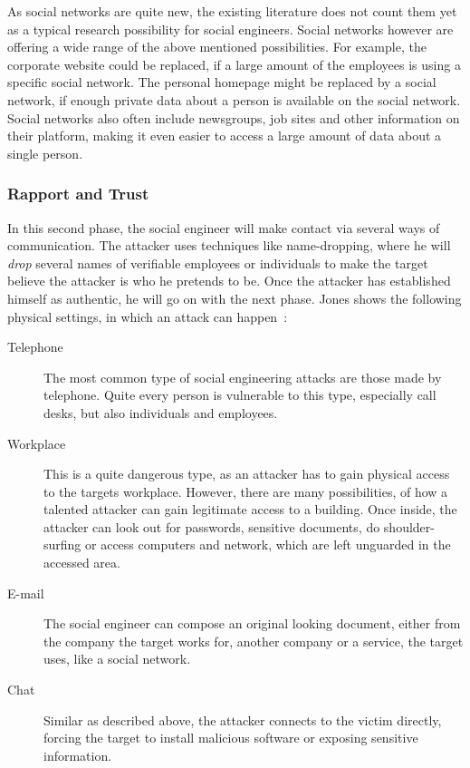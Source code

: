 As social networks are quite new, the existing literature does not count them
yet as a typical research possibility for social engineers. Social networks
however are offering a wide range of the above mentioned possibilities. For
example, the corporate website could be replaced, if a large amount of the
employees is using a specific social network. The personal homepage might be
replaced by a social network, if enough private data about a person is
available on the social network. Social networks also often include newsgroups,
job sites and other information on their platform, making it even easier to
access a large amount of data about a single person.


\subsubsection{Rapport and Trust}

In this second phase, the social engineer will make contact via several ways of
communication. The attacker uses techniques like name-dropping, where he will
\textit{drop} several names of verifiable employees or individuals to make the
target believe the attacker is who he pretends to be. Once the attacker has
established himself as authentic, he will go on with the next phase. Jones
shows the following physical settings, in which an attack can happen~\cite{jones2004}:

\begin{description}
\item[Telephone] The most common type of social engineering attacks are those
  made by telephone. Quite every person is vulnerable to this type,
  especially call desks, but also individuals and employees.
\item[Workplace] This is a quite dangerous type, as an attacker has to gain
  physical access to the targets workplace. However, there are many
  possibilities, of how a talented attacker can gain legitimate access to a building.
  Once inside, the attacker can look out for passwords, sensitive documents,
  do shoulder-surfing or access computers and network, which are left
  unguarded in the accessed area.
\item[E-mail] The social engineer can compose an original looking document,
  either from the company the target works for, another company or a service,
  the target uses, like a social network.
\item[Chat] Similar as described above, the attacker connects to the victim directly,
  forcing the target to install malicious software or exposing sensitive
  information.
\end{description}


